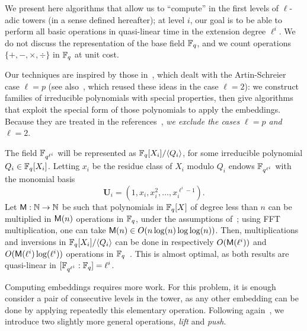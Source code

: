 \documentclass{sig-alternate}
\newcommand{\uu}{\mathbf{U}}  %
\begin{document}
We present here algorithms that allow us to ``compute'' in the
first levels of $\ell$-adic towers (in a sense defined hereafter); at
level $i$, our goal is to be able to perform all basic operations in
quasi-linear time in the extension degree $\ell^i$.  We do not discuss
the representation of the base field $\mathbb{F}_q$, and we count 
operations $\{+,-,\times,\div\}$ in $\mathbb{F}_q$ at unit cost.


Our techniques are inspired by those
in~\cite{cantor89,couveignes00,df+schost12}, which dealt with the
Artin-Schreier case $\ell=p$ (see also~\cite{DoSc12}, which reused
these ideas in the case $\ell=2$): we construct families of
irreducible polynomials with special properties, then give algorithms
that exploit the special form of those polynomials to apply the
embeddings. Because they are treated in the
references~\cite{df+schost12,DoSc12}, {\em we exclude the cases
  $\ell=p$ and $\ell=2$}.

The field $\mathbb{F}_{q^{\ell^i}}$ will be represented as $\mathbb{F}_q[X_i]/\langle
Q_i\rangle$, for some irreducible polynomial $Q_i \in
\mathbb{F}_q[X_i]$. Letting $x_i$ be the residue class of $X_i$ modulo $Q_i$
endows $\mathbb{F}_{q^{\ell^i}}$ with the monomial basis
\begin{equation}
  \label{eq:uni-basis1}
  \uu_i = (1,x_{i},x_{i}^2,\ldots,x_{i}^{\ell^{i}-1}).
\end{equation}
Let $\mathsf{M} : \mathbb{N} \rightarrow
\mathbb{N}$ be such that polynomials in $\mathbb{F}_q[X]$ of degree less than $n$ can
be multiplied in $\mathsf{M}(n)$ operations in $\mathbb{F}_q$, under the
assumptions of~\cite[Ch.~8.3]{vzGG}; using FFT multiplication, one can
take $\mathsf{M}(n)\in O(n\log (n) \log\log (n))$. Then, multiplications and
inversions in $\mathbb{F}_q[X_i]/\langle Q_i \rangle$ can be done in
respectively $O(\mathsf{M}(\ell^i))$ and $O(\mathsf{M}(\ell^i)\log(\ell^i))$
operations in $\mathbb{F}_q$~\cite[Ch.~9-11]{vzGG}. This is almost optimal, as
both results are quasi-linear in $[\mathbb{F}_{q^{\ell^i}}:\mathbb{F}_q]=\ell^i$.

Computing embeddings requires more work. For this problem, it is
enough consider a pair of consecutive levels in the tower, as any
other embedding can be done by applying repeatedly this elementary
operation. Following again~\cite{df+schost12}, we introduce two
slightly more general operations, {\em lift} and {\em push}.
\end{document}
